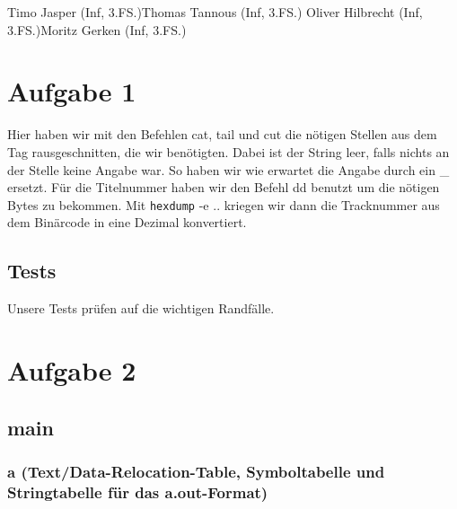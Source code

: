 \documentclass{ti2}
\begin{document}
\lstset{linewidth=\linewidth,breaklines=true}
%
                {Timo Jasper (Inf, 3.FS.)}{Thomas Tannous (Inf, 3.FS.)}%
                {Oliver Hilbrecht (Inf, 3.FS.)}{Moritz Gerken (Inf, 3.FS.)}%

\section{Aufgabe 1}
Hier haben wir mit den Befehlen cat, tail und cut die nötigen Stellen
aus dem Tag rausgeschnitten, die wir benötigten. 
Dabei ist der String leer, falls nichts an der Stelle keine Angabe war.
So haben wir wie erwartet die Angabe durch ein \_ ersetzt.
Für die Titelnummer haben wir den Befehl dd benutzt um die nötigen
Bytes zu bekommen. Mit \lstinline{hexdump} -e .. kriegen wir dann die Tracknummer aus dem Binärcode in eine Dezimal konvertiert.

\subsection{Tests}
Unsere Tests prüfen auf die wichtigen Randfälle. \\

\section{Aufgabe 2}%

\subsection{main}

\subsubsection{a (Text/Data-Relocation-Table, Symboltabelle und Stringtabelle für das a.out-Format)}
\end{document}
